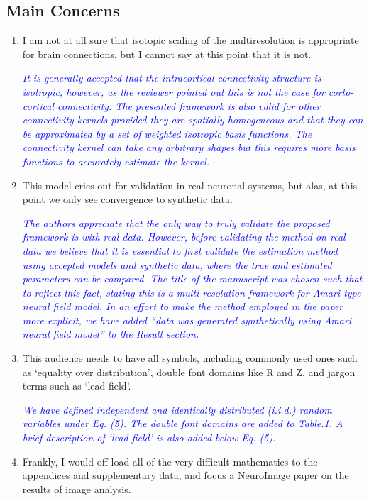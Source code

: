 \documentclass{article}
\newcommand{\parham}[1]{\textcolor{blue}{#1}}
\begin{document}
    \subsection{Main Concerns}
		\begin{enumerate} 
			\item I am not at all sure that isotopic scaling of the multiresolution is appropriate for brain connections, but I cannot say at this point that it is not.
			
			\emph{\parham{It is generally accepted that the intracortical connectivity structure is isotropic, however, as the reviewer pointed out this is not the case  for corto-cortical connectivity. The presented framework is also valid for other connectivity kernels provided they are spatially homogeneous and that they can be approximated by a set of weighted isotropic basis functions. The connectivity kernel can take any arbitrary shapes but this requires more basis functions to accurately estimate the kernel.}}
			 
			\item This model cries out for validation in real neuronal systems, but alas, at this point we only see convergence to synthetic data.   
			 
			 \emph{\parham{The authors appreciate that the only way to truly validate the proposed framework is with real data. However, before validating the method on real data we believe that it is essential to first validate the estimation method using accepted models and synthetic data, where the true and estimated parameters can be compared. The title of the manuscript was chosen such that to reflect this fact, stating this is a multi-resolution framework for Amari type neural field model. In an effort to make the method employed in the paper more explicit, we have added ``data was generated synthetically using Amari neural field model'' to the Result section.}}  
			
			\item This audience needs to have all symbols, including commonly used ones such as `equality over distribution', double font domains like R and Z, and jargon terms such as `lead field'.
			
			\emph{\parham{ We have defined independent and identically distributed (i.i.d.) random variables under Eq. (5). The double font domains are added to Table.1. A brief description of `lead field' is also added below Eq. (5).}}  
			
			\item Frankly, I would off-load all of the very difficult mathematics to the appendices and supplementary data, and focus a NeuroImage paper on the results of image analysis. 
			

\end{enumerate}
\end{document}

